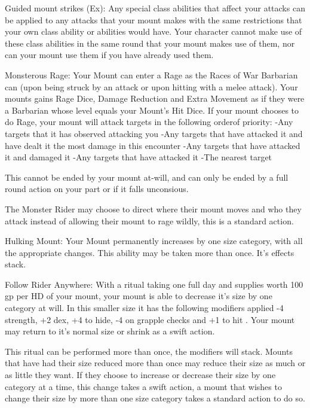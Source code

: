 Guided mount strikes (Ex): Any special class abilities that affect your attacks can be applied to any attacks that your mount makes with the same restrictions that your own class ability or abilities would have. Your character cannot make use of these class abilities in the same round that your mount makes use of them, nor can your mount use them if you have already used them.

Monsterous Rage: Your Mount can enter a Rage as the Races of War Barbarian can (upon being struck by an attack or upon hitting with a melee attack). Your mounts gains Rage Dice, Damage Reduction and Extra Movement as if they were a Barbarian whose level equals your Mount's Hit Dice. If your mount chooses to do Rage, your mount will attack targets in the following orderof priority:
-Any targets that it has observed attacking you
-Any targets that have attacked it and have dealt it the most damage in this encounter
-Any targets that have attacked it and damaged it
-Any targets that have attacked it
-The nearest target

This cannot be ended by your mount at-will, and can only be ended by a full round action on your part or if it falls unconsious.

The Monster Rider may choose to direct where their mount moves and who they attack instead of allowing their mount to rage wildly, this is a standard action.

Hulking Mount: Your Mount permanently increases by one size category, with all the appropriate changes. This ability may be taken more than once. It's effects stack.

Follow Rider Anywhere: With a ritual taking one full day and supplies worth 100 gp per HD of your mount, your mount is able to decrease it's size by one category at will. In this smaller size it has the following modifiers applied -4 strength, +2 dex, +4 to hide, -4 on grapple checks and +1 to hit . Your mount may return to it's normal size or shrink as a swift action.

This ritual can be performed more than once, the modifiers will stack. Mounts that have had their size reduced more than once may reduce their size as much or as little they want. If they choose to increase or decrease their size by one category at a time, this change takes a swift action, a mount that wishes to change their size by more than one size category takes a standard action to do so.